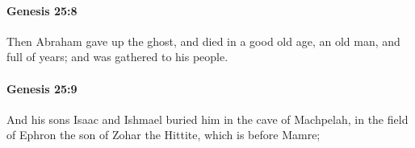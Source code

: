 		\paragraph{Genesis 25:8} %
			\label{GENESIS-25-8}

			Then Abraham gave up the ghost, and died in a good old age, an old man, and full of years; and was gathered to his people.


		\paragraph{Genesis 25:9} %
			\label{GENESIS-25-9}

			And his sons Isaac and Ishmael buried him in the cave of Machpelah, in the field of Ephron the son of Zohar the Hittite, which is before Mamre;


